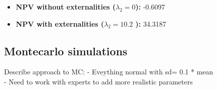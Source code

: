 \documentclass[]{article}
\begin{document}
\begin{itemize}
\item
  \textbf{NPV without externalities (\(\lambda_2 = 0\)):} -0.6097
\item
  \textbf{NPV with externalities (\(\lambda_2 = 10.2\) ):} 34.3187
\end{itemize}

\hypertarget{montecarlo-simulations}{%
\subsection{Montecarlo simulations}\label{montecarlo-simulations}}

Describe approach to MC: - Eveything normal with sd= 0.1 * mean\\
- Need to work with experts to add more realistic parameters
\end{document}
